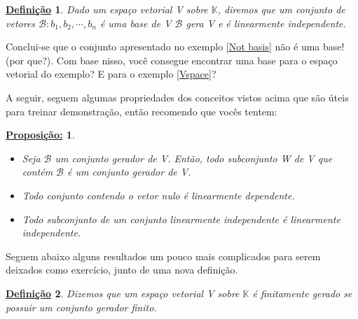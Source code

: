 \documentclass{article}
\newtheorem*{def*}{\underline{Defini\c c\~ao}}
\newtheorem*{proposition*}{\underline{Proposi\c c\~ao:}}
\begin{document}
\begin{def*}
	Dado um  espa\c co vetorial V sobre $\mathbb{K}$, diremos que um conjunto de vetores $\mathcal{B}: b_1, b_2, \cdots{}, b_n$ \'e uma base de V
	$\mathcal{B}$ gera V e \'e linearmente independente.
\end{def*}

Conclui-se que o conjunto apresentado no exemplo \ref{Not basis} n\~ao \'e uma base! (por que?). Com base nisso,
voc\^e consegue encontrar uma base para o espa\c co vetorial do exemplo? E para o exemplo \ref{Vspace}?

A seguir, seguem algumas propriedades dos conceitos vistos acima que s\~ao \'uteis para treinar demonstra\c c\~ao,
ent\~ao recomendo que voc\^es tentem:

\begin{proposition*}
	\begin{itemize}
		\item[a)] Seja $\mathcal{B}$ um conjunto gerador de V. Ent\~ao, todo subconjunto W de V que cont\'em $\mathcal{B}$ \'e um
		      conjunto gerador de V.
		\item[b)] Todo conjunto contendo o vetor nulo \'e linearmente dependente.
		\item[c)] Todo subconjunto de um conjunto linearmente independente \'e linearmente independente.
	\end{itemize}
\end{proposition*}

Seguem abaixo alguns resultados um pouco mais complicados para serem deixados como exerc\'icio, junto de uma nova defini\c c\~ao.

\begin{def*}
	Dizemos que um espa\c co vetorial V sobre $\mathbb{K}$ \'e finitamente gerado se possuir um conjunto gerador finito.
\end{def*}
\end{document}
